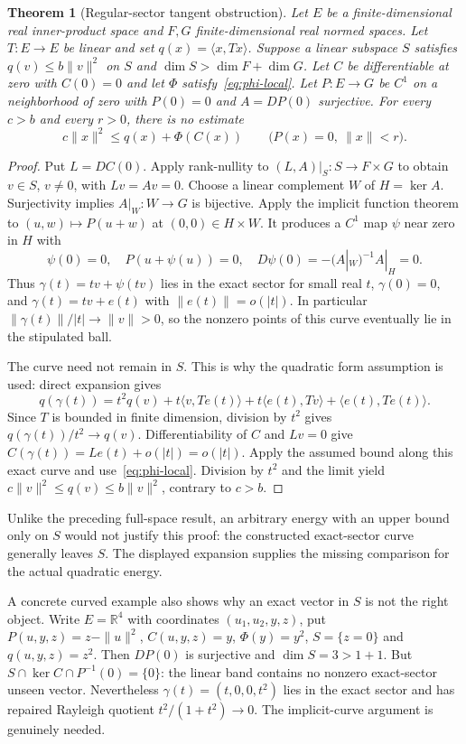\documentclass[11pt]{article}
\newtheorem{theorem}{Theorem}[section]
\newcommand{\R}{\mathbb R}
\newcommand{\ip}[2]{\langle #1,#2\rangle}
\begin{document}
\begin{theorem}[Regular-sector tangent obstruction]\label{thm:regular-sector}
Let $E$ be a finite-dimensional real inner-product space and $F,G$ finite-dimensional
real normed spaces. Let $T:E\to E$ be linear and set $q(x)=\ip{x}{Tx}$.
Suppose a linear subspace $S$ satisfies $q(v)\le b\|v\|^2$ on $S$ and
$\dim S>\dim F+\dim G$. Let $C$ be differentiable at zero with $C(0)=0$ and
let $\Phi$ satisfy~\eqref{eq:phi-local}. Let $P:E\to G$ be $C^1$ on a
neighborhood of zero with $P(0)=0$ and $A=DP(0)$ surjective. For every
$c>b$ and every $r>0$, there is no estimate
\begin{equation}\label{eq:nonlinear-sector-bound}
 c\|x\|^2\le q(x)+\Phi(C(x))
 \qquad\bigl(P(x)=0,\ \|x\|<r\bigr).
\end{equation}
\end{theorem}
\begin{proof}
Put $L=DC(0)$. Apply rank-nullity to $(L,A)|_S:S\to F\times G$ to obtain
$v\in S$, $v\ne0$, with $Lv=Av=0$. Choose a linear complement $W$ of
$H=\ker A$. Surjectivity implies $A|_W:W\to G$ is bijective. Apply the
implicit function theorem to $(u,w)\mapsto P(u+w)$ at $(0,0)\in H\times W$.
It produces a $C^1$ map $\psi$ near zero in $H$ with
\[
 \psi(0)=0,\quad P(u+\psi(u))=0,\quad
 D\psi(0)=-(A|_W)^{-1}A|_H=0.
\]
Thus $\gamma(t)=tv+\psi(tv)$ lies in the exact sector for small real $t$,
$\gamma(0)=0$, and $\gamma(t)=tv+e(t)$ with $\|e(t)\|=o(|t|)$. In particular
$\|\gamma(t)\|/|t|\to\|v\|>0$, so the nonzero points of this curve eventually
lie in the stipulated ball.

The curve need not remain in $S$. This is why the quadratic form assumption
is used: direct expansion gives
\[
 q(\gamma(t))=t^2q(v)+t\ip{v}{Te(t)}
       +t\ip{e(t)}{Tv}+\ip{e(t)}{Te(t)}.
\]
Since $T$ is bounded in finite dimension, division by $t^2$ gives
$q(\gamma(t))/t^2\to q(v)$. Differentiability of $C$ and $Lv=0$ give
$C(\gamma(t))=Le(t)+o(|t|)=o(|t|)$. Apply the assumed bound along this exact
curve and use~\eqref{eq:phi-local}. Division by $t^2$ and the limit yield
$c\|v\|^2\le q(v)\le b\|v\|^2$, contrary to $c>b$.
\end{proof}
Unlike the preceding full-space result, an arbitrary energy with an upper
bound only on $S$ would not justify this proof: the constructed exact-sector
curve generally leaves $S$. The displayed expansion supplies the missing
comparison for the actual quadratic energy.

A concrete curved example also shows why an exact vector in $S$ is not the
right object. Write $E=\R^4$ with coordinates $(u_1,u_2,y,z)$, put
$P(u,y,z)=z-\|u\|^2$, $C(u,y,z)=y$, $\Phi(y)=y^2$, $S=\{z=0\}$ and
$q(u,y,z)=z^2$. Then $DP(0)$ is surjective and $\dim S=3>1+1$.
But $S\cap\ker C\cap P^{-1}(0)=\{0\}$: the linear band contains no
nonzero exact-sector unseen vector. Nevertheless
$\gamma(t)=(t,0,0,t^2)$ lies in the exact sector and has repaired Rayleigh
quotient $t^2/(1+t^2)\to0$. The implicit-curve argument is genuinely needed.
\end{document}
